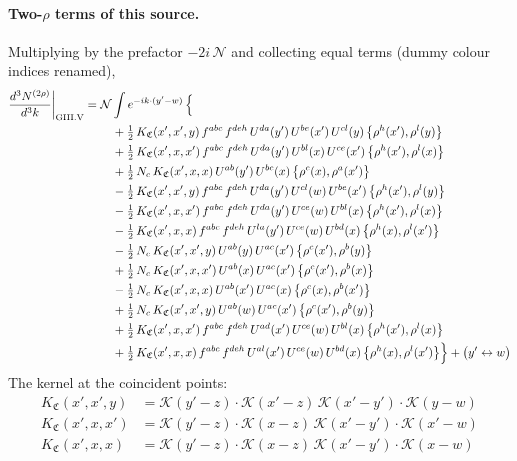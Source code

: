 \documentclass[10pt]{article}
\numberwithin{equation}{section}
\newcommand{\KK}{\mathcal K}
\newcommand{\NN}{\mathcal N}
\begin{document}
\paragraph{Two-$\rho$ terms of this source.} Multiplying by the prefactor $-2i\,\NN$ and collecting equal terms (dummy colour indices renamed),
\begin{align}
\frac{d^3N^{(2\rho)}}{d^3k}\bigg|_{\rm GIII.V}={}&\NN\int e^{-ik\cdot(y'-w)}\,\Big\{\notag\\
&\quad +\tfrac12\,K_{\mathfrak C}(x',x',y)\,f^{abc}\,f^{deh}\,U^{da}(y')\,U^{be}(x')\,U^{cl}(y)\,\big\{\rho^{h}(x'),\rho^{l}(y)\big\}\notag\\
&\quad +\tfrac12\,K_{\mathfrak C}(x',x,x')\,f^{abc}\,f^{deh}\,U^{da}(y')\,U^{bl}(x)\,U^{ce}(x')\,\big\{\rho^{h}(x'),\rho^{l}(x)\big\}\notag\\
&\quad +\tfrac12\,N_{c}\,K_{\mathfrak C}(x',x,x)\,U^{ab}(y')\,U^{bc}(x)\,\big\{\rho^{c}(x),\rho^{a}(x')\big\}\notag\\
&\quad -\tfrac12\,K_{\mathfrak C}(x',x',y)\,f^{abc}\,f^{deh}\,U^{da}(y')\,U^{cl}(w)\,U^{be}(x')\,\big\{\rho^{h}(x'),\rho^{l}(y)\big\}\notag\\
&\quad -\tfrac12\,K_{\mathfrak C}(x',x,x')\,f^{abc}\,f^{deh}\,U^{da}(y')\,U^{ce}(w)\,U^{bl}(x)\,\big\{\rho^{h}(x'),\rho^{l}(x)\big\}\notag\\
&\quad -\tfrac12\,K_{\mathfrak C}(x',x,x)\,f^{abc}\,f^{deh}\,U^{la}(y')\,U^{ce}(w)\,U^{bd}(x)\,\big\{\rho^{h}(x),\rho^{l}(x')\big\}\notag\\
&\quad -\tfrac12\,N_{c}\,K_{\mathfrak C}(x',x',y)\,U^{ab}(y)\,U^{ac}(x')\,\big\{\rho^{c}(x'),\rho^{b}(y)\big\}\notag\\
&\quad +\tfrac12\,N_{c}\,K_{\mathfrak C}(x',x,x')\,U^{ab}(x)\,U^{ac}(x')\,\big\{\rho^{c}(x'),\rho^{b}(x)\big\}\notag\\
&\quad -\tfrac12\,N_{c}\,K_{\mathfrak C}(x',x,x)\,U^{ab}(x')\,U^{ac}(x)\,\big\{\rho^{c}(x),\rho^{b}(x')\big\}\notag\\
&\quad +\tfrac12\,N_{c}\,K_{\mathfrak C}(x',x',y)\,U^{ab}(w)\,U^{ac}(x')\,\big\{\rho^{c}(x'),\rho^{b}(y)\big\}\notag\\
&\quad +\tfrac12\,K_{\mathfrak C}(x',x,x')\,f^{abc}\,f^{deh}\,U^{ad}(x')\,U^{ce}(w)\,U^{bl}(x)\,\big\{\rho^{h}(x'),\rho^{l}(x)\big\}\notag\\
&\quad +\tfrac12\,K_{\mathfrak C}(x',x,x)\,f^{abc}\,f^{deh}\,U^{al}(x')\,U^{ce}(w)\,U^{bd}(x)\,\big\{\rho^{h}(x),\rho^{l}(x')\big\}\Big\}+\big(y'\leftrightarrow w\big)\label{eq:res-GIII.V}
\end{align}
The kernel at the coincident points:
\begin{align*}
K_{\mathfrak C}(x',x',y)&=\KK(y'-z)\cdot\KK(x'-z)\,\KK(x'-y')\cdot\KK(y-w)\\K_{\mathfrak C}(x',x,x')&=\KK(y'-z)\cdot\KK(x-z)\,\KK(x'-y')\cdot\KK(x'-w)\\K_{\mathfrak C}(x',x,x)&=\KK(y'-z)\cdot\KK(x-z)\,\KK(x'-y')\cdot\KK(x-w)
\end{align*}
\end{document}
